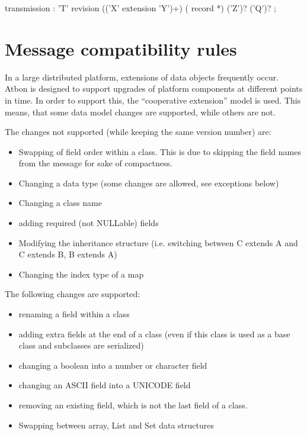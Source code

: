 \documentclass[11pt,a4paper,oneside]{article}
\begin{document}
\begin{rail}
transmission :
    'T' revision
    (('X' extension 'Y')+) 
    ( record *) 
    ('Z')?
    ('Q')?
    ;
\end{rail}

\vspace{8mm}


\section{Message compatibility rules}
In a large distributed platform, extensions of data objects frequently occur. Atbon is designed to support upgrades of platform
components at different points in time. In order to support this, the
``cooperative extension'' model is used. This means, that some data model changes are supported, while others are not.

The changes not supported (while keeping the same version number) are:
\begin{itemize}
    \item Swapping of field order within a class. This is due to skipping the field names from the message for sake of
    compactness.
    \item Changing a data type (some changes are allowed, see exceptions below)
    \item Changing a class name
    \item adding required (not NULLable) fields
    \item Modifying the inheritance structure (i.e. switching between C extends A and C extends B, B extends A)
    \item Changing the index type of a map
\end{itemize}

The following changes are supported:
\begin{itemize}
    \item renaming a field within a class
    \item adding extra fields at the end of a class (even if this class is used as a base class and subclasses are serialized)
    \item changing a boolean into a number or character field
    \item changing an ASCII field into a UNICODE field
    \item removing an existing field, which is not the last field of a class.
    \item Swapping between array, List and Set data structures 
\end{itemize}
\end{document}
